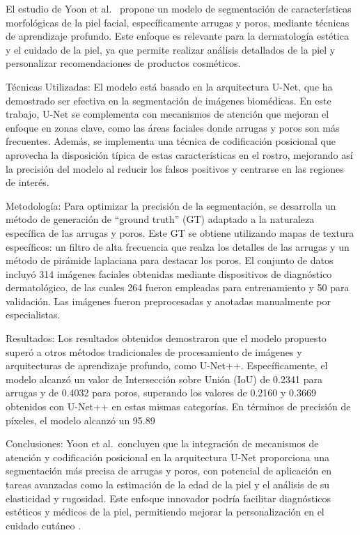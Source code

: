 
El estudio de Yoon et al.\ \cite{yoon2023} propone un modelo de segmentación de características morfológicas de la piel facial, específicamente arrugas y poros, mediante técnicas de aprendizaje profundo. Este enfoque es relevante para la dermatología estética y el cuidado de la piel, ya que permite realizar análisis detallados de la piel y personalizar recomendaciones de productos cosméticos.

Técnicas Utilizadas: El modelo está basado en la arquitectura U-Net, que ha demostrado ser efectiva en la segmentación de imágenes biomédicas. En este trabajo, U-Net se complementa con mecanismos de atención que mejoran el enfoque en zonas clave, como las áreas faciales donde arrugas y poros son más frecuentes. Además, se implementa una técnica de codificación posicional que aprovecha la disposición típica de estas características en el rostro, mejorando así la precisión del modelo al reducir los falsos positivos y centrarse en las regiones de interés.

Metodología: Para optimizar la precisión de la segmentación, se desarrolla un método de generación de “ground truth” (GT) adaptado a la naturaleza específica de las arrugas y poros. Este GT se obtiene utilizando mapas de textura específicos: un filtro de alta frecuencia que realza los detalles de las arrugas y un método de pirámide laplaciana para destacar los poros. El conjunto de datos incluyó 314 imágenes faciales obtenidas mediante dispositivos de diagnóstico dermatológico, de las cuales 264 fueron empleadas para entrenamiento y 50 para validación. Las imágenes fueron preprocesadas y anotadas manualmente por especialistas.

Resultados: Los resultados obtenidos demostraron que el modelo propuesto superó a otros métodos tradicionales de procesamiento de imágenes y arquitecturas de aprendizaje profundo, como U-Net++. Específicamente, el modelo alcanzó un valor de Intersección sobre Unión (IoU) de 0.2341 para arrugas y de 0.4032 para poros, superando los valores de 0.2160 y 0.3669 obtenidos con U-Net++ en estas mismas categorías. En términos de precisión de píxeles, el modelo alcanzó un 95.89%

Conclusiones: Yoon et al.\ concluyen que la integración de mecanismos de atención y codificación posicional en la arquitectura U-Net proporciona una segmentación más precisa de arrugas y poros, con potencial de aplicación en tareas avanzadas como la estimación de la edad de la piel y el análisis de su elasticidad y rugosidad. Este enfoque innovador podría facilitar diagnósticos estéticos y médicos de la piel, permitiendo mejorar la personalización en el cuidado cutáneo \cite{yoon2023}.


